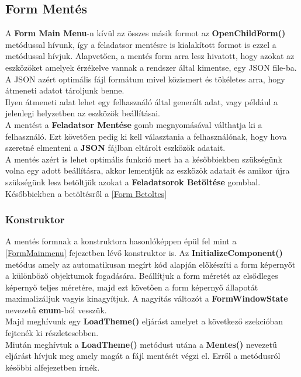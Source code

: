 \documentclass[tocnopagenum]{thesis-ekf}
\theoremstyle{definition}
\theoremstyle{remark}
\begin{document}
	\subsection{Form Mentés}
	\label{Form Mentes}
	A \textbf{Form Main Menu}-n kívül az összes másik formot az \textbf{OpenChildForm()} metódussal hívunk, így a feladatsor mentésre is kialakított formot is ezzel a metódussal hívjuk. Alapvetően, a mentés form arra lesz hivatott, hogy azokat az eszközöket amelyek érzékelve vannak a rendszer által kimentse, egy JSON file-ba.
	\\
	A JSON azért optimális fájl formátum mivel közismert és tökéletes arra, hogy átmeneti adatot tároljunk benne. 
	\\
	Ilyen átmeneti adat lehet egy felhasználó által generált adat, vagy például a jelenlegi helyzetben az eszközök beállításai. 
	\\
	A mentést a \textbf{Feladatsor Mentése} gomb megnyomásával válthatja ki a felhasználó. Ezt követően pedig ki kell választania a felhasználónak, hogy hova szeretné elmenteni a \textbf{JSON} fájlban eltárolt eszközök adatait.
	\\
	A mentés azért is lehet optimális funkció mert ha a későbbiekben szükségünk volna egy adott beállításra, akkor lementjük az eszközök adatait és amikor újra szükségünk lesz betöltjük azokat a \textbf{Feladatsorok Betöltése} gombbal. Későbbiekben a betöltésről a \ref{Form Betoltes}
	\subsubsection{Konstruktor}
	A mentés formnak a konstruktora hasonlóképpen épül fel mint a \ref{FormMainmenu} fejezetben lévő konstruktor is. Az \textbf{InitializeComponent()} metódus amely az automatikusan megírt kód alapján előkészíti a form képernyőt a különböző objektumok fogadására. Beállítjuk a form méretét az elsődleges képernyő teljes méretére, majd ezt követően a form képernyő állapotát maximalizáljuk vagyis kinagyítjuk. A nagyítás változót a \textbf{FormWindowState} nevezetű \textbf{enum}-ból vesszük.
	\\
	Majd meghívunk egy \textbf{LoadTheme()} eljárást amelyet a következő szekcióban fejtenék ki részletesebben. 
	\\
	Miután meghívtuk a \textbf{LoadTheme()} metódust utána a \textbf{Mentes()} nevezetű eljárást hívjuk meg amely magát a fájl mentését végzi el. Erről a metódusról későbbi alfejezetben írnék.
\end{document}
